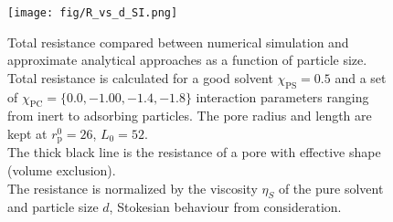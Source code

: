 \documentclass[10pt, a4paper]{article}
\begin{document}
\begin{multicols}{2}
\begin{figure}[H]
    \centering
    \texttt{[image: fig/R\_vs\_d\_SI.png]}
    \caption{
        Total resistance compared between numerical simulation and approximate analytical approaches as a function of particle size.
        Total resistance is calculated for a good solvent $\chi_{\text{PS}} = 0.5$ and a set of 
        $\chi_{\text{PC}} = \{0.0, -1.00, -1.4, -1.8\}$ 
        interaction parameters ranging from inert to adsorbing particles.
        The pore radius and length are kept at $r_{\text{p}}^{0} = 26$, $L_{0} = 52$.
        \\
        The thick black line is the resistance of a pore with effective shape (volume exclusion).
        \\
        The resistance is normalized by the viscosity $\eta_{S}$ of the pure solvent and particle size $d$, Stokesian behaviour from consideration.
        }
    \label{fig:CFD_comparison}
\end{figure}


\end{multicols}
    


\end{document}
